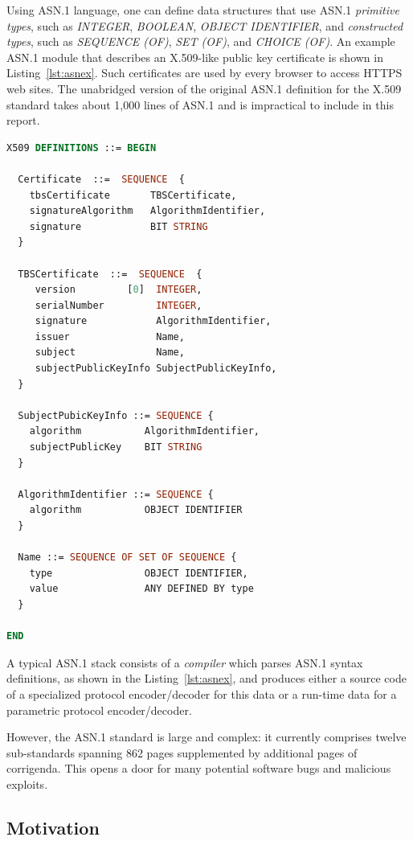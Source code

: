 \documentclass[acmsmall,nonacm]{acmart}
\begin{document}
Using ASN.1 language, one can define data structures that use
ASN.1 {\it primitive types}, such as \emph{INTEGER}, \emph{BOOLEAN}, \emph{OBJECT
IDENTIFIER}, and {\it constructed types}, such as \emph{SEQUENCE (OF)},
\emph{SET (OF)}, and \emph{CHOICE (OF)}. An example ASN.1 module that describes an X.509-like public key
certificate is shown in Listing~\ref{lst:asnex}. Such certificates are
used by every browser to access HTTPS web sites. The unabridged
version of the original ASN.1 definition for the X.509 standard takes
about 1,000 lines of ASN.1 and is impractical to include in this
report. 

\begin{lstlisting}[language=ASN1,label=lst:asnex,
  basicstyle=\ttfamily\footnotesize,
  caption={ASN.1 example of X.509 certificates, revised for brevity}]
X509 DEFINITIONS ::= BEGIN

  Certificate  ::=  SEQUENCE  {
    tbsCertificate       TBSCertificate,
    signatureAlgorithm   AlgorithmIdentifier,
    signature            BIT STRING
  }

  TBSCertificate  ::=  SEQUENCE  {
     version         [0]  INTEGER,
     serialNumber         INTEGER,
     signature            AlgorithmIdentifier,
     issuer               Name,
     subject              Name,
     subjectPublicKeyInfo SubjectPublicKeyInfo,
  }

  SubjectPubicKeyInfo ::= SEQUENCE {
    algorithm           AlgorithmIdentifier,
    subjectPublicKey    BIT STRING
  }

  AlgorithmIdentifier ::= SEQUENCE {
    algorithm           OBJECT IDENTIFIER
  }

  Name ::= SEQUENCE OF SET OF SEQUENCE {
    type                OBJECT IDENTIFIER,
    value               ANY DEFINED BY type
  }

END
\end{lstlisting}


A typical ASN.1 stack consists of a \textit{compiler} which parses
ASN.1 syntax definitions, as shown in the Listing~\ref{lst:asnex}, and
produces either a source code of a specialized protocol encoder/decoder for this data or a run-time data for a parametric protocol
encoder/decoder.

However, the ASN.1 standard is large and complex:
it currently comprises twelve sub-standards spanning 862 pages
supplemented by additional pages of corrigenda. This opens
a door for many potential software bugs and malicious exploits.
  
\subsection{Motivation}
\end{document}
